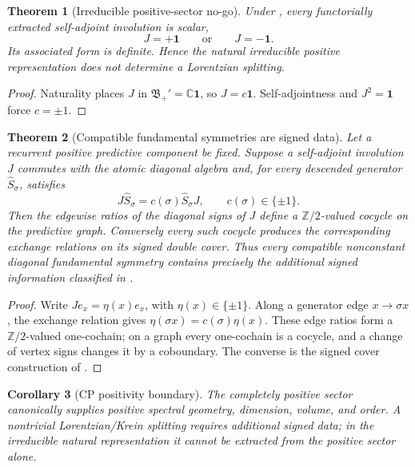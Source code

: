 \documentclass[11pt]{article}
\newtheorem{theorem}{Theorem}[section]
\newtheorem{corollary}[theorem]{Corollary}
\theoremstyle{definition}
\theoremstyle{remark}
\newcommand{\Z}{\mathbb{Z}}
\newcommand{\C}{\mathbb{C}}
\newcommand{\one}{\mathbf{1}}
\begin{document}
\begin{theorem}[Irreducible positive-sector no-go]
\label{thm:irreducible-positive-no-go}
Under , every functorially extracted
self-adjoint involution is scalar,
\[
  J=+\one\qquad\text{or}\qquad J=-\one.
\]
Its associated form is definite.  Hence the natural irreducible positive
representation does not determine a Lorentzian splitting.
\end{theorem}

\begin{proof}
Naturality places \(J\) in \(\mathfrak B_+'=\C\one\), so \(J=c\one\).
Self-adjointness and \(J^2=\one\) force \(c=\pm1\).
\end{proof}

\begin{theorem}[Compatible fundamental symmetries are signed data]
\label{thm:functorial-positive-obstruction}
Let a recurrent positive predictive component be fixed.  Suppose a self-adjoint
involution \(J\) commutes with the atomic diagonal algebra and, for every
descended generator \(\widehat S_\sigma\), satisfies
\[
  J\widehat S_\sigma=c(\sigma)\widehat S_\sigma J,
  \qquad c(\sigma)\in\{\pm1\}.
\]
Then the edgewise ratios of the diagonal signs of \(J\) define a
\(\Z/2\)-valued cocycle on the predictive graph.  Conversely every such cocycle
produces the corresponding exchange relations on its signed double cover.
Thus every compatible nonconstant diagonal fundamental symmetry contains
precisely the additional signed information classified in .
\end{theorem}

\begin{proof}
Write \(Je_x=\eta(x)e_x\), with \(\eta(x)\in\{\pm1\}\).  Along a generator
edge \(x\to\sigma x\), the exchange relation gives
\(\eta(\sigma x)=c(\sigma)\eta(x)\).  These edge ratios form a
\(\Z/2\)-valued one-cochain; on a graph every one-cochain is a cocycle, and a
change of vertex signs changes it by a coboundary.  The converse is the signed
cover construction of .
\end{proof}

\begin{corollary}[CP positivity boundary]
\label{cor:positivity-obstruction}
The completely positive sector canonically supplies positive spectral geometry,
dimension, volume, and order.  A nontrivial Lorentzian/Krein splitting requires
additional signed data; in the irreducible natural representation it cannot be
extracted from the positive sector alone.
\end{corollary}
\end{document}
